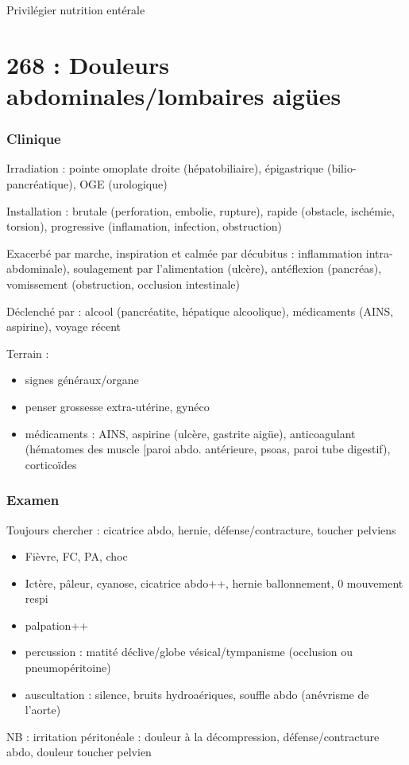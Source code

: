\documentclass[11pt]{article}
\begin{document}
Privilégier nutrition entérale

\section{268 : Douleurs abdominales/lombaires aigües}
\label{sec:orge84ddc5}

\subsubsection{Clinique}
\label{sec:org319899a}
Irradiation : pointe omoplate droite (hépatobiliaire), épigastrique
(bilio-pancréatique), OGE (urologique)

Installation : brutale (perforation, embolie, rupture), rapide (obstacle,
ischémie, torsion), progressive (inflamation, infection, obstruction)

Exacerbé par marche, inspiration et calmée par décubitus : inflammation
intra-abdominale), soulagement par l'alimentation (ulcère), antéflexion
(pancréas), vomissement (obstruction, occlusion intestinale)

Déclenché par : alcool (pancréatite, hépatique alcoolique), médicaments (AINS,
aspirine), voyage récent

Terrain :
\begin{itemize}
\item signes généraux/organe
\item \female{} penser grossesse extra-utérine, gynéco
\item médicaments : AINS, aspirine (ulcère, gastrite aigüe), anticoagulant
(hématomes des muscle [paroi abdo. antérieure, psoas, paroi tube digestif),
corticoïdes
\end{itemize}

\subsubsection{Examen}
\label{sec:orgedd9e65}
\begin{tcolorbox}
Toujours chercher : cicatrice abdo, hernie, défense/contracture, toucher pelviens
\end{tcolorbox}

\begin{itemize}
\item Fièvre, FC, PA, choc
\item Ictère, pâleur, cyanose, cicatrice abdo++, hernie ballonnement, 0 mouvement
respi
\item palpation++
\item percussion : matité déclive/globe vésical/tympanisme (occlusion ou
pneumopéritoine)
\item auscultation : silence, bruits hydroaériques, souffle abdo (anévrisme de
l'aorte)
\end{itemize}
NB : irritation péritonéale : douleur à la décompression, défense/contracture
abdo, douleur toucher pelvien
\end{document}
